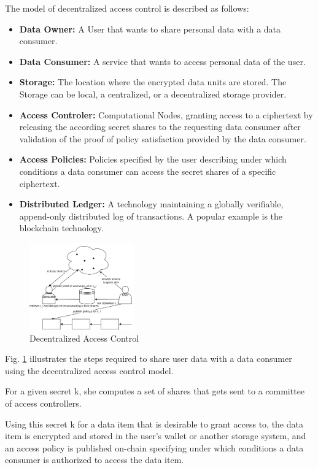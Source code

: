 \documentclass[conference]{IEEEtran}
\begin{document}
The model of decentralized access control is described as follows:

\begin{itemize}
  \item \textbf{Data Owner:} A User that wants to share personal data with a data consumer.
  \item \textbf{Data Consumer:} A service that wants to access personal data of the user.
  \item \textbf{Storage:} The location where the encrypted data units are stored.
  The Storage can be local, a centralized, or a decentralized storage provider.
  \item \textbf{Access Controler:} Computational Nodes, granting access to a ciphertext by releasing the according secret shares to the requesting data consumer after validation of the proof of policy satisfaction provided by the data consumer.
  \item \textbf{Access Policies:} Policies specified by the user describing under which conditions a data consumer can access the secret shares of a specific ciphertext.
  \item \textbf{Distributed Ledger:} A technology maintaining a globally verifiable, append-only distributed log of transactions. A popular example is the blockchain technology. 
\end{itemize}

\begin{figure}[htbp]
  \centering
  \includegraphics[width=0.4\textwidth]{figures/decentralized_access_control.png}
  \caption{Decentralized Access Control}
  \label{fig:decentralized_access_control}
\end{figure}
Fig. \ref{fig:decentralized_access_control} illustrates the steps required to share user data with a data consumer using the decentralized access control model.

For a given secret k, she computes a set of shares that gets sent to a committee of access controllers.

Using this secret k for a data item that is desirable to grant access to, the data item is encrypted and stored in the user's wallet or another storage system, and an access policy is published on-chain specifying under which conditions a data consumer is authorized to access the data item.
\end{document}
